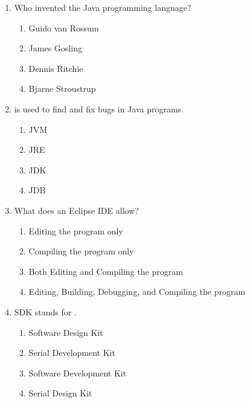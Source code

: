 \documentclass[11pt,a4paper]{article}
\begin{document}
\begin{enumerate}[label=(\roman*),leftmargin=*,itemsep=8pt]

  \item Who invented the Java programming language?
  
\begin{enumerate}[label=(\alph*),itemsep=2pt]
    \item Guido van Rossum
    \item James Gosling
    \item Dennis Ritchie
    \item Bjarne Stroustrup
  \end{enumerate}

  \item \underline{\hspace{2cm}} is used to find and fix bugs in Java programs.
  
\begin{enumerate}[label=(\alph*),itemsep=2pt]
    \item JVM
    \item JRE
    \item JDK
    \item JDB
  \end{enumerate}

  \item What does an Eclipse IDE allow?
  
\begin{enumerate}[label=(\alph*),itemsep=2pt]
    \item Editing the program only
    \item Compiling the program only
    \item Both Editing and Compiling the program
    \item Editing, Building, Debugging, and Compiling the program
  \end{enumerate}

  \item SDK stands for \underline{\hspace{2cm}}.
  
\begin{enumerate}[label=(\alph*),itemsep=2pt]
    \item Software Design Kit
    \item Serial Development Kit
    \item Software Development Kit
    \item Serial Design Kit
  \end{enumerate}


\end{enumerate}
\end{document}
